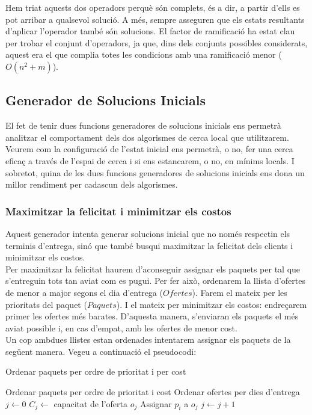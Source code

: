 \documentclass[a4paper]{article}
\begin{document}
	Hem triat aquests dos operadors perquè són complets, és a dir, a partir d'ells es pot arribar a qualsevol solució. A més, sempre asseguren que els estats resultants d'aplicar l'operador també són solucions. El factor de ramificació ha estat clau per trobar el conjunt d'operadors, ja que, dins dels conjunts possibles considerats, aquest era el que complia totes les condicions amb una ramificació menor ($O(n^2+m)$).
	
	\subsection{Generador de Solucions Inicials}
	
	El fet de tenir dues funcions generadores de solucions inicials ens permetrà analitzar el comportament dels dos algorismes de cerca local que utilitzarem. Veurem com la configuració de l'estat inicial ens permetrà, o no, fer una cerca eficaç a través de l'espai de cerca i si ens estancarem, o no, en mínims locals. I sobretot, quina de les dues funcions generadores de solucions inicials ens dona un millor rendiment per cadascun dels algorismes.
	
	\subsubsection{Maximitzar la felicitat i minimitzar els costos}
	\label{sec:GenSolIni_felicitat}
	
	Aquest generador intenta generar solucions inicial que no només respectin els terminis d'entrega, sinó que també busqui maximitzar la felicitat dels clients i minimitzar els costos. \\
	
	Per maximitzar la felicitat haurem d'aconseguir assignar els paquets per tal que s'entreguin tots tan aviat com es pugui. Per fer això, ordenarem la llista d'ofertes de menor a major segons el dia d'entrega ($Ofertes$). Farem el mateix per les prioritats del paquet ($Paquets$). I el mateix per minimitzar els costos: endreçarem primer les ofertes més barates. D'aquesta manera, s'enviaran els paquets el més aviat possible i, en cas d'empat, amb les ofertes de menor cost. \\
	
	Un cop ambdues llistes estan ordenades intentarem assignar els paquets de la següent manera. Vegeu a continuació el pseudocodi:
	
	\begin{algorithm} [H]
		\caption{Ordenar paquets per ordre de prioritat i per cost}
		\begin{algorithmic}[1]
			\State Ordenar paquets per ordre de prioritat i cost
			\State Ordenar ofertes per dies d'entrega
			\State $j \gets 0$
			\State $C_j \gets$ capacitat de l'oferta $o_j$
			\State Assignar $p_i$ a $o_j$
			\Else
			\State $j \gets j + 1$ 
			\EndIf
			\EndWhile
			\EndFor
		\end{algorithmic}
	\end{algorithm}
	
\end{document}
